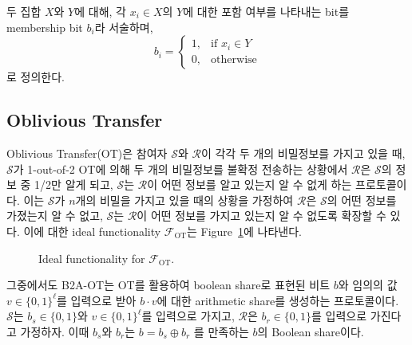 \documentclass[sigconf,anonymous,review]{acmart}
\begin{document}
두 집합 $X$와 $Y$에 대해, 각 $x_i\in X$의 $Y$에 대한 포함 여부를 나타내는 bit를 membership bit $b_i$라 서술하며,
\[
b_i =
\begin{cases}
1, & \text{if } x_i \in Y\\
0, & \text{otherwise}
\end{cases}
\]
로 정의한다.


\subsection{Oblivious Transfer}\label{sec:ot}
Oblivious Transfer(OT)은 참여자 $\mathcal{S}$와 $\mathcal{R}$이 각각 두 개의 비밀정보를 가지고 있을 때, $\mathcal{S}$가 1-out-of-2 OT에 의해 두 개의 비밀정보를 불확정 전송하는 상황에서 $\mathcal{R}$은 $\mathcal{S}$의 정보 중 1/2만 알게 되고, $\mathcal{S}$는 $\mathcal{R}$이 어떤 정보를 알고 있는지 알 수 없게 하는 프로토콜이다. 이는 $\mathcal{S}$가 $n$개의 비밀을 가지고 있을 때의 상황을 가정하여 $\mathcal{R}$은 $\mathcal{S}$의 어떤 정보를 가졌는지 알 수 없고, $\mathcal{S}$는 $\mathcal{R}$이 어떤 정보를 가지고 있는지 알 수 없도록 확장할 수 있다. 이에 대한 ideal functionality $\mathcal{F}_{\mathrm{OT}}$는 Figure~\ref{fig:ot-ideal-functionality}에 나타낸다.

\begin{figure}[h]
    \centering
    \caption{Ideal functionality for
    $\mathcal{F}_{\mathrm{OT}}$.}
    \label{fig:ot-ideal-functionality}
\end{figure}

그중에서도 B2A-OT는 OT를 활용하여 boolean share로 표현된 비트 \(b\)와 임의의 값 \(v \in \{0,1\}^\ell\)를 입력으로 받아 \(b \cdot v\)에 대한 arithmetic share를 생성하는 프로토콜이다. $\mathcal{S}$는
\(b_s\in\{0,1\}\)와 \(v\in\{0,1\}^\ell\)를 입력으로 가지고,
$\mathcal{R}$은 \(b_r\in\{0,1\}\)를 입력으로 가진다고 가정하자. 이때 \(b_s\)와 \(b_r\)는 $b=b_s\oplus b_r$
를 만족하는 \(b\)의 Boolean share이다.
\end{document}

